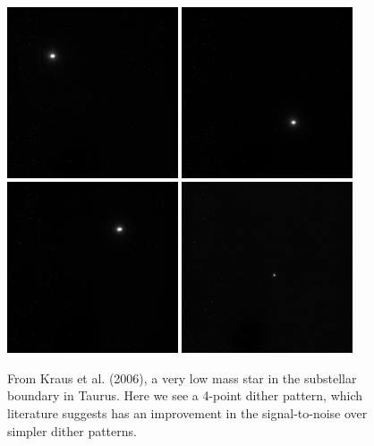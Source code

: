 \documentclass[12pt]{article}
\begin{document}
\newpage
\begin{figure}[H]
\centering
\includegraphics[width=0.45\textwidth]{dither1.jpg}
\includegraphics[width=0.45\textwidth]{dither2.jpg}
\includegraphics[width=0.45\textwidth]{dither3.jpg}
\includegraphics[width=0.45\textwidth]{dither4.jpg}
\caption{From Kraus et al. (2006), a very low mass star in the substellar boundary in Taurus. Here we see a 4-point dither pattern, which literature suggests has an improvement in the signal-to-noise over simpler dither patterns.}
\end{figure}
\end{document}

